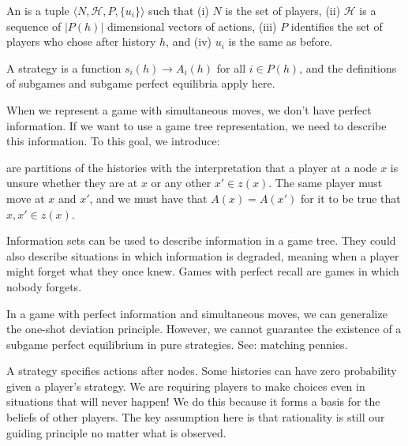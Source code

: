 \documentclass[10pt]{article}
\begin{document}
\begin{definition}
	An  is a tuple $\langle N, \mathcal{H}, P, \{u_i\}\rangle$ such that (i) $N$ is the set of players, (ii) $\mathcal{H}$ is a sequence of $|P(h)|$ dimensional vectors of actions, (iii) $P$ identifies the set of players who chose after history $h$, and (iv) $u_i$ is the same as before.
	
	A strategy is a function $s_i(h) \to A_i(h)$ for all $i \in P(h)$, and the definitions of subgames and subgame perfect equilibria apply here.
\end{definition}

\begin{remark}
	When we represent a game with simultaneous moves, we don't have perfect information. If we want to use a game tree representation, we need to describe this information. To this goal, we introduce:
\end{remark}

\begin{definition}
	 are partitions of the histories with the interpretation that a player at a node $x$ is unsure whether they are at $x$ or any other $x' \in z(x)$. The same player must move at $x$ and $x'$, and we must have that $A(x) = A(x')$ for it to be true that $x,x'\in z(x)$. 
\end{definition}

\begin{remark}
	Information sets can be used to describe information in a game tree. They could also describe situations in which information is degraded, meaning when a player might forget what they once knew. Games with perfect recall are games in which nobody forgets.
\end{remark}

\begin{remark}
	In a game with perfect information and simultaneous moves, we can generalize the one-shot deviation principle. However, we cannot guarantee the existence of a subgame perfect equilibrium in pure strategies. See: matching pennies.
\end{remark}

\begin{remark}
	A strategy specifies actions after nodes. Some histories can have zero probability given a player's strategy. We are requiring players to make choices even in situations that will never happen! We do this because it forms a basis for the beliefs of other players. The key assumption here is that rationality is still our guiding principle no matter what is observed.
\end{remark}
\end{document}
